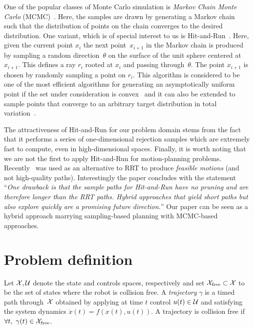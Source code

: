 \documentclass[letterpaper, 10 pt, conference]{ieeeconf}  %
\begin{document}
One of the popular classes of Monte Carlo simulation is 
\emph{Markov Chain Monte Carlo} (MCMC)~\cite{ADDJ03}.
Here, the samples are drawn by generating a Markov chain such that the distribution of points on the chain converges to the desired distribution.
One variant, which is of special interest to us is 
Hit-and-Run~\cite{KSZ11}.
Here, given the current point $x_i$ the next point~$x_{i+1}$ in the Markov chain is produced by sampling a random direction~$\theta$ on the surface of the unit sphere centered at $x_{i+1}$. This defines a ray $r_i$ rooted at $x_i$ and passing through~$\theta$. The point $x_{i+1}$ is chosen by randomly sampling a point on $r_i$.
This algorithm is considered to be one of the most efficient algorithms for generating an asymptotically uniform point if the set under consideration is convex~\cite{LV06}
and it can also be extended to sample points that converge to an arbitrary target distribution in total variation~\cite{RS94}.

The attractiveness of Hit-and-Run for our problem domain stems from the fact that it performs a series of one-dimensional rejection samples which are extremely fast to compute, even in high-dimensional spaces. 
Finally, it is worth noting that we are not the first to apply Hit-and-Run for motion-planning problems.
Recently~\cite{YPVA17} was used as an alternative to RRT to produce \emph{feasible motions} (and not high-quality paths). 
Interestingly the paper concludes with the statement ``\emph{One drawback is that the sample paths for Hit-and-Run have no pruning and are therefore longer than the RRT paths. Hybrid approaches that yield short paths but also explore quickly are a promising future direction.}''
Our paper can be seen as a hybrid approach marrying sampling-based planning with MCMC-based approaches.

\section{Problem definition}
\label{sec:pdef}


Let $\mathcal{X}, \mathcal{U}$ denote the state and controls spaces, respectively and set $\mathcal{X}_{\rm free} \subset \mathcal{X}$ to be the set of states where the robot is collision free.
A \emph{trajectory} $\gamma$ is a timed path through~$\mathcal{X}$ obtained by applying at time $t$ control $u(t) \in \mathcal{U}$ and satisfying the system dynamics 
$\dot{x}(t) = f( x(t) , u(t) )$.
A trajectory is collision free if $\forall t,~\gamma(t) \in \mathcal{X}_{\rm free}$.
\end{document}
